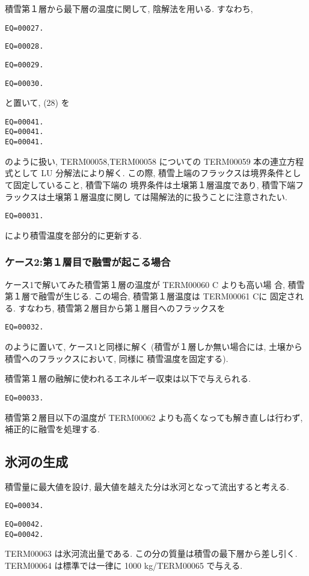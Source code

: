 積雪第１層から最下層の温度に関して, 陰解法を用いる.
すなわち,
\begin{verbatim}
EQ=00027.
\end{verbatim}
\begin{verbatim}
EQ=00028.
\end{verbatim}
\begin{verbatim}
EQ=00029.
\end{verbatim}
\begin{verbatim}
EQ=00030.
\end{verbatim}
と置いて, (28) を
\begin{verbatim}
EQ=00041.
EQ=00041.
EQ=00041.
\end{verbatim}
のように扱い, TERM00058,TERM00058 についての
TERM00059 本の連立方程式として LU 分解法により解く.
この際, 積雪上端のフラックスは境界条件として固定していること, 積雪下端の
境界条件は土壌第１層温度であり, 積雪下端フラックスは土壌第１層温度に関し
ては陽解法的に扱うことに注意されたい.
\begin{verbatim}
EQ=00031.
\end{verbatim}
により積雪温度を部分的に更新する.

\subsubsection{ケース2:第１層目で融雪が起こる場合}

ケース1で解いてみた積雪第１層の温度が TERM00060 C よりも高い場
合, 積雪第１層で融雪が生じる. この場合, 積雪第１層温度は TERM00061 Cに
固定される. すなわち, 積雪第２層目から第１層目へのフラックスを
\begin{verbatim}
EQ=00032.
\end{verbatim}
のように置いて, ケース1と同様に解く
(積雪が１層しか無い場合には, 土壌から積雪へのフラックスにおいて, 同様に
積雪温度を固定する).

積雪第１層の融解に使われるエネルギー収束は以下で与えられる.
\begin{verbatim}
EQ=00033.
\end{verbatim}

積雪第２層目以下の温度が TERM00062 よりも高くなっても解き直しは行わず,
補正的に融雪を処理する.

\subsection{氷河の生成}

積雪量に最大値を設け, 最大値を越えた分は氷河となって流出すると考える.
\begin{verbatim}
EQ=00034.
\end{verbatim}
\begin{verbatim}
EQ=00042.
EQ=00042.
\end{verbatim}
TERM00063 は氷河流出量である. この分の質量は積雪の最下層から差し引く.
TERM00064 は標準では一律に 1000 kg/TERM00065 で与える.

